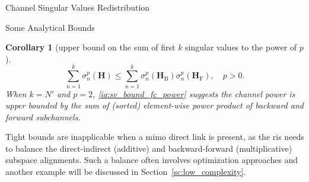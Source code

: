 \documentclass[journal]{IEEEtran}
\newtheorem{remark}{Remark}
\newtheorem{corollary}{Corollary}[proposition]
\begin{document}
\begin{section}{Channel Singular Values Redistribution}
\begin{subsection}{Some Analytical Bounds}

		\begin{corollary}[upper bound on the sum of first $k$ singular values to the power of $p$\label{co:sum_power}]
			\begin{equation}
				\sum_{n=1}^k \sigma_n^p(\mathbf{H}) \le \sum_{n=1}^k \sigma_n^p(\mathbf{H}_\mathrm{B}) \sigma_n^p(\mathbf{H}_\mathrm{F}), \quad p > 0.
				\label{iq:sv_bound_fc_power}
			\end{equation}
			When $k = N'$ and $p = 2$, \eqref{iq:sv_bound_fc_power} suggests the channel power is upper bounded by the sum of (sorted) element-wise power product of backward and forward subchannels.
		\end{corollary}


		Tight bounds are inapplicable when a \gls{mimo} direct link is present, as the \gls{ris} needs to balance the direct-indirect (additive) and backward-forward (multiplicative) subspace alignments.
		Such a balance often involves optimization approaches and another example will be discussed in Section~\ref{sc:low_complexity}.
	\end{subsection}

\end{section}
\end{document}

